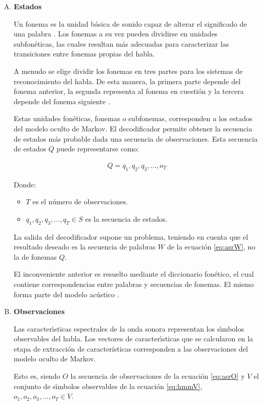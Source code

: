 \begin{enumerate}[A)]
	\item \textbf{Estados}


	Un fonema es la unidad b\'asica de sonido capaz de alterar el significado de una palabra \cite{Armbruster2003}.
	Los fonemas a su vez pueden dividirse en unidades subfon\'eticas, las cuales resultan m\'as adecuadas para
	caracterizar las transiciones entre fonemas propias del habla.

	A menudo se elige dividir los fonemas en tres partes para los sistemas de reconocimiento del habla.
	De esta manera, la primera parte depende del fonema anterior, la segunda representa al fonema en cuesti\'on
	y la tercera depende del fonema siguiente \cite{CMUConcepts}.

	Estas unidades fon\'eticas, fonemas o subfonemas, corresponden a los estados del modelo oculto de Markov.
	El decodificador permite obtener la secuencia de estados m\'as probable dada una secuencia de observaciones.
	Esta secuencia de estados $Q$ puede representarse como:

	\begin{align}
		Q = q_1,q_2,q_3,\ldots,o_T\label{eq:hmmQ}
	\end{align}

	Donde:
	\begin{itemize}
		\item $T$ es el n\'umero de observaciones.
		\item $q_1,q_2,q_3,\ldots,q_T \in S$ es la secuencia de estados.
	\end{itemize}

	La salida del decodificador supone un problema, teniendo en cuenta que el resultado deseado es la secuencia 
	de palabras $W$ de la ecuaci\'on \ref{eq:asrW}, no la de fonemas $Q$.

	El inconveniente anterior es resuelto mediante el diccionario fon\'etico, el cual contiene correspondencias 
	entre palabras y secuencias de fonemas. El mismo forma parte del modelo ac\'ustico \cite{huang-handbook10}.

	\item \textbf{Observaciones}


	Las caracter{\'\i}sticas espectrales de la onda sonora representan los s{\'\i}mbolos observables del habla.
	Los vectores de caracter{\'\i}sticas que se calcularon en la etapa de extracción de características
	corresponden a las observaciones del modelo oculto de Markov.

	Esto es, siendo $O$ la secuencia de observaciones de la ecuaci\'on \ref{eq:asrO} 
	y $V$ el conjunto de s{\'\i}mbolos observables de la ecuaci\'on \ref{eq:hmmV}, $o_1,o_2,o_3,\ldots,o_T \in V$.


\end{enumerate}
